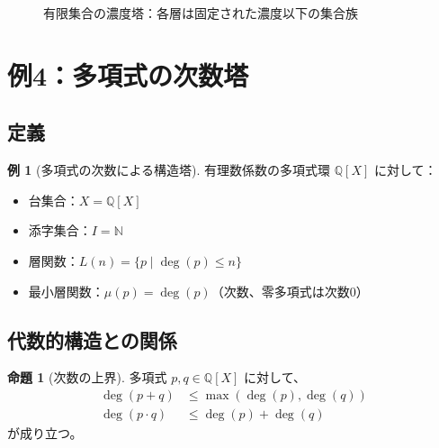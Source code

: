 \documentclass[a4paper,12pt]{ltjsarticle}
\theoremstyle{definition}
\newtheorem{example}[definition]{例}
\newtheorem{proposition}[definition]{命題}
\begin{document}
\begin{figure}[h]
\centering
{}
\caption{有限集合の濃度塔：各層は固定された濃度以下の集合族}
\end{figure}

\section{例4：多項式の次数塔}

\subsection{定義}

\begin{example}[多項式の次数による構造塔]
\label{ex:poly-degree}
有理数係数の多項式環 $\mathbb{Q}[X]$ に対して：
\begin{itemize}
\item 台集合：$X = \mathbb{Q}[X]$
\item 添字集合：$I = \mathbb{N}$
\item 層関数：$L(n) = \{p \mid \deg(p) \leq n\}$
\item 最小層関数：$\mu(p) = \deg(p)$（次数、零多項式は次数0）
\end{itemize}
\end{example}

\subsection{代数的構造との関係}

\begin{proposition}[次数の上界]
多項式 $p, q \in \mathbb{Q}[X]$ に対して、
\begin{align*}
\deg(p + q) &\leq \max(\deg(p), \deg(q)) \\
\deg(p \cdot q) &\leq \deg(p) + \deg(q)
\end{align*}
が成り立つ。
\end{proposition}
\end{document}
